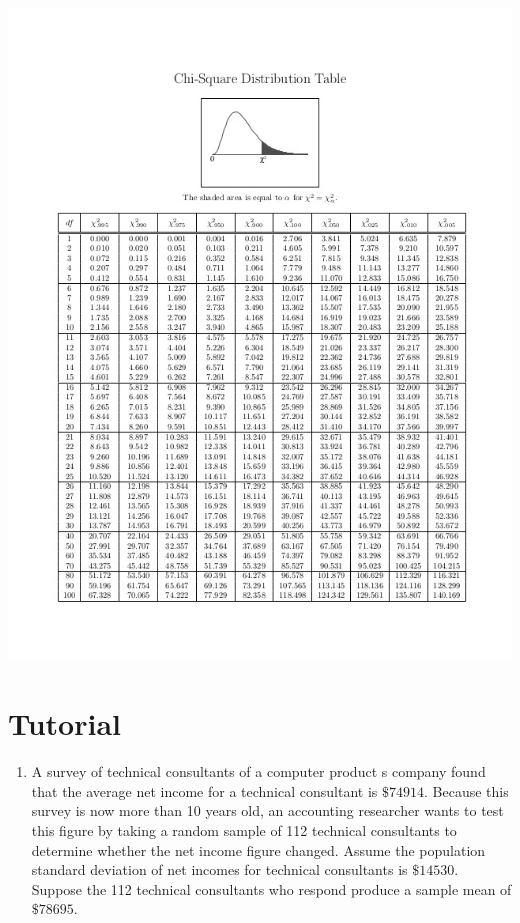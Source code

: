 \documentclass[]{book}
\providecommand{\tightlist}{%
  \setlength{\itemsep}{0pt}\setlength{\parskip}{0pt}}
\begin{document}
\begin{center}\includegraphics[width=1\linewidth]{figure/chisquaretable} \end{center}

\newpage

\hypertarget{tutorial-2}{%
\section*{Tutorial}\label{tutorial-2}}


\begin{enumerate}
\def\labelenumi{\arabic{enumi}.}
\tightlist
\item
  A survey of technical consultants of a computer product s company found that the average net income for a technical consultant is \(\$74914\). Because this survey is now more than 10 years old, an accounting researcher wants to test this figure by taking a random sample of 112 technical consultants to determine whether the net income figure changed. Assume the population standard deviation of net incomes for technical consultants is \(\$14530\). Suppose the 112 technical consultants who respond produce a sample mean of \(\$78695\).
\end{enumerate}
\end{document}
